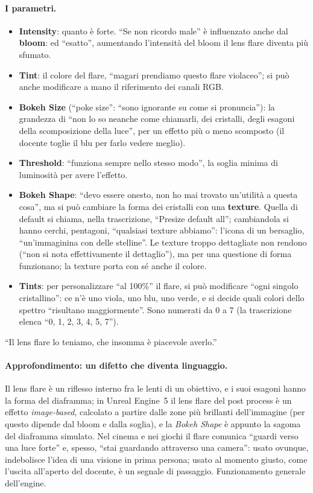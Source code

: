 \paragraph{I parametri.}
\begin{itemize}
  \item \textbf{Intensity}: quanto è forte. ``Se non ricordo male'' è influenzato anche dal
        \textbf{bloom}: ed ``esatto'', aumentando l'intensità del bloom il lens flare diventa
        più sfumato.
  \item \textbf{Tint}: il colore del flare, ``magari prendiamo questo flare violaceo''; si
        può anche modificare a mano il riferimento dei canali RGB.
  \item \textbf{Bokeh Size} (``poke size'': ``sono ignorante su come si pronuncia''): la
        grandezza di ``non lo so neanche come chiamarli, dei cristalli, degli esagoni della
        scomposizione della luce'', per un effetto più o meno scomposto (il docente toglie il
        blu per farlo vedere meglio).
  \item \textbf{Threshold}: ``funziona sempre nello stesso modo'', la soglia minima di
        luminosità per avere l'effetto.
  \item \textbf{Bokeh Shape}: ``devo essere onesto, non ho mai trovato un'utilità a questa
        cosa'', ma si può cambiare la forma dei cristalli con una \textbf{texture}. Quella di
        default si chiama, nella trascrizione, ``Presize default all''; cambiandola si hanno
        cerchi, pentagoni, ``qualsiasi texture abbiamo'': l'icona di un bersaglio, ``un'immaginina
        con delle stelline''. Le texture troppo dettagliate non rendono (``non si nota
        effettivamente il dettaglio''), ma per una questione di forma funzionano; la texture
        porta con sé anche il colore.
  \item \textbf{Tints}: per personalizzare ``al 100\%'' il flare, si può modificare ``ogni
        singolo cristallino'': ce n'è uno viola, uno blu, uno verde, e si decide quali colori
        dello spettro ``risultano maggiormente''. Sono numerati da 0 a 7 (la trascrizione elenca
        ``0, 1, 2, 3, 4, 5, 7'').
\end{itemize}
``Il lens flare lo teniamo, che insomma è piacevole averlo.''

\paragraph{Approfondimento: un difetto che diventa linguaggio.} Il lens flare è un riflesso
interno fra le lenti di un obiettivo, e i suoi esagoni hanno la forma del diaframma; in
Unreal Engine~5 il lens flare del post process è un effetto \emph{image-based}, calcolato a
partire dalle zone più brillanti dell'immagine (per questo dipende dal bloom e dalla soglia),
e la \emph{Bokeh Shape} è appunto la sagoma del diaframma simulato. Nel cinema e nei giochi il
flare comunica ``guardi verso una luce forte'' e, spesso, ``stai guardando attraverso una
camera'': usato ovunque, indebolisce l'idea di una visione in prima persona; usato al momento
giusto, come l'uscita all'aperto del docente, è un segnale di passaggio. Funzionamento generale
dell'engine.

